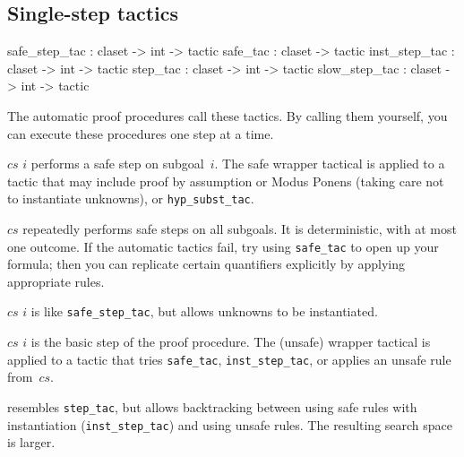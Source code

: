 \subsection{Single-step tactics}
\begin{ttbox} 
safe_step_tac : claset -> int -> tactic
safe_tac      : claset        -> tactic
inst_step_tac : claset -> int -> tactic
step_tac      : claset -> int -> tactic
slow_step_tac : claset -> int -> tactic
\end{ttbox}
The automatic proof procedures call these tactics.  By calling them
yourself, you can execute these procedures one step at a time.
\begin{ttdescription}
\item[\ttindexbold{safe_step_tac} $cs$ $i$] performs a safe step on
subgoal~$i$. The safe wrapper tactical is applied to a tactic that may include 
proof by assumption or Modus Ponens (taking care not to instantiate unknowns), 
or {\tt hyp_subst_tac}.

\item[\ttindexbold{safe_tac} $cs$] repeatedly performs safe steps on all 
subgoals.  It is deterministic, with at most one outcome.  If the automatic
tactics fail, try using {\tt safe_tac} to open up your formula; then you
can replicate certain quantifiers explicitly by applying appropriate rules.

\item[\ttindexbold{inst_step_tac} $cs$ $i$] is like {\tt safe_step_tac},
but allows unknowns to be instantiated.

\item[\ttindexbold{step_tac} $cs$ $i$] is the basic step of the proof
  procedure.  The (unsafe) wrapper tactical is applied to a tactic that tries
 {\tt safe_tac}, {\tt inst_step_tac}, or applies an unsafe rule from~$cs$.

\item[\ttindexbold{slow_step_tac}] 
  resembles {\tt step_tac}, but allows backtracking between using safe
  rules with instantiation ({\tt inst_step_tac}) and using unsafe rules.
  The resulting search space is larger.
\end{ttdescription}

